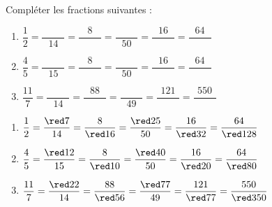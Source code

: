 \begin{exercice*}
   Compléter les fractions suivantes : \medskip
   \begin{enumerate}
      \item $\dfrac{1}{2} =\dfrac{\qquad\;}{14} =\dfrac{8}{\qquad\;} =\dfrac{\qquad\;}{50} =\dfrac{16}{\qquad\;} =\dfrac{64}{\qquad\;}$ \\ [2mm]
      \item $\dfrac{4}{5} =\dfrac{\qquad\;}{15} =\dfrac{8}{\qquad\;} =\dfrac{\qquad\;}{50} =\dfrac{16}{\qquad\;} =\dfrac{64}{\qquad\;}$ \\ [2mm]
      \item $\dfrac{11}{7} =\dfrac{\qquad\;}{14} =\dfrac{88}{\qquad\;} =\dfrac{\qquad\;}{49} =\dfrac{121}{\qquad\;} =\dfrac{550}{\qquad\;}$ \\
   \end{enumerate}
\end{exercice*}
\begin{corrige}
      \begin{enumerate}
      \item $\dfrac{1}{2} =\dfrac{\red 7}{14} =\dfrac{8}{\red 16} =\dfrac{\red 25}{50} =\dfrac{16}{\red 32} =\dfrac{64}{\red 128}$ \\ [2mm]
      \item $\dfrac{4}{5} =\dfrac{\red 12}{15} =\dfrac{8}{\red 10} =\dfrac{\red 40}{50} =\dfrac{16}{\red 20} =\dfrac{64}{\red 80}$ \\ [2mm]
      \item $\dfrac{11}{7} =\dfrac{\red 22}{14} =\dfrac{88}{\red 56} =\dfrac{\red 77}{49} =\dfrac{121}{\red 77} =\dfrac{550}{\red 350}$
   \end{enumerate}
\end{corrige}